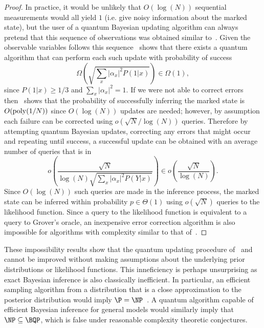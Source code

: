 \documentclass[aps,amsmath,onecolumn,amssymb]{revtex4}
\begin{document}
\begin{proof}
In practice, it would be unlikely that $O(\log(N))$ sequential measurements would all yield $1$ (i.e. give noisy information about the marked state), but the user of a quantum Bayesian updating algorithm can always pretend that this sequence of observations was obtained similar to~. 
Given the observable variables follows this sequence~ shows that 
there exists a quantum algorithm that can perform each such update with probability of success
\begin{equation}
\Omega\left(\sqrt{\sum_x |\alpha_x|^2 P(1|x)}\right) \in \Omega(1),\label{eq:Pfail}
\end{equation}
since $P(1|x) \ge 1/3$ and $\sum_x |\alpha_x|^2 =1$.
If we were not able to correct errors then~ shows that the probability of successfully inferring the marked state is $O({\rm poly}(1/N))$ since $O(\log(N))$ updates are needed; however, by assumption each failure can be corrected using $o(\sqrt{N}/\log(N))$ queries.  Therefore by attempting quantum Bayesian updates, correcting any errors that might occur and repeating until success, a successful update can be
obtained with an average number of queries that is in
\begin{equation}
o\left( \frac{\sqrt{N}}{\log(N)\sqrt{\sum_x |\alpha_x|^2 P(Y|x)}}\right)\in o\left(\frac{\sqrt{N}}{\log(N)} \right).
\end{equation}
Since $O(\log(N))$ such queries are made in the inference process, the marked state can be inferred within probability $p\in \Theta(1)$ using $o(\sqrt{N})$ queries to the likelihood function.  Since a query
to the likelihood function is equivalent to a query to Grover's oracle, an inexpensive error correction algorithm is also impossible for algorithms with complexity similar to that of~.
\end{proof}

These impossibility results show that the quantum updating procedure of~\cite{LYC14} and~ cannot be improved  without making assumptions about the underlying prior distributions or likelihood functions.  This inneficiency is perhaps unsurprising as exact Bayesian inference is also classically inefficient.  In particular, an efficient sampling algorithm from a distribution that is a close approximation to the  posterior distribution would imply $\P=\NP$~\cite{dagum1993approximating}.  A quantum algorithm capable of efficient Bayesian inference for general models would similarly imply that $\NP \subseteq \BQP$, which is false under reasonable complexity theoretic conjectures.
\end{document}
